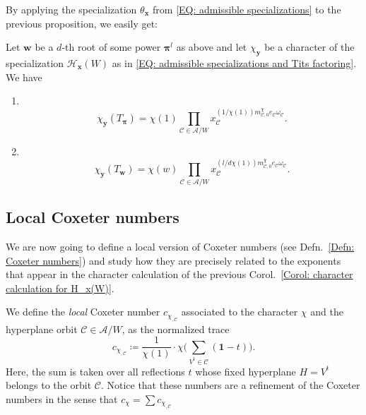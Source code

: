 By applying the specialization $\theta_{\bm x}$ from \eqref{EQ: admissible specializations} to the previous proposition, we easily get: 

\begin{coro}\label{Corol: character calculation for H_x(W)}
Let $\bm w$ be a $d$-th root of some power $\bm \pi^l$ as above and let $\chi_{\bm y}$ be a character of the specialization $\mathcal{H}_{\bm x}(W)$ as in \eqref{EQ: admissible specializations and Tits factoring}. We have \begin{enumerate}
\item\ \vspace{-0.35cm} $$\chi_{\bm y}(T_{\bm \pi})=\chi(1)\prod_{\mathcal{C}\in\mathcal{A}/W}x_{\mathcal{C}}^{(1/\chi(1))m^{\chi}_{\mathcal{C},0}e_{\mathcal{C}}\omega_{\mathcal{C}}}.$$
\item\ \vspace{-0.35cm} $$\chi_{\bm y}(T_{\bm w})=\chi(w)\prod_{\mathcal{C}\in\mathcal{A}/W}x_{\mathcal{C}}^{(l/d\chi(1))m^{\chi}_{\mathcal{C},0}e_{\mathcal{C}}\omega_{\mathcal{C}}}.$$
\end{enumerate}
\end{coro}


\subsection{Local Coxeter numbers}

We are now going to define a local version of Coxeter numbers (see Defn.~\ref{Defn: Coxeter numbers}) and study how they are precisely related to the exponents that appear in the character calculation of the previous Corol.~\ref{Corol: character calculation for H_x(W)}.


\begin{defi}\label{Defn: Local Coxeter numbers} 
We define the \emph{local} Coxeter number $c_{\chi_{,\mathcal{C}}}$ associated to the character $\chi$ and the hyperplane orbit $\mathcal{C}\in\mathcal{A}/W$, as the normalized trace $$c_{\chi_{,\mathcal{C}}}\coloneqq \dfrac{1}{\chi(1)}\cdot\chi\Big( \sum_{V^{t}\in\mathcal{C}}(\bm 1-t)\Big).$$ Here, the sum is taken over all reflections $t$ whose fixed hyperplane $H=V^{t}$ belongs to the orbit $\mathcal{C}$. Notice that these numbers are a refinement of the Coxeter numbers in the sense that $c_{\chi}=\sum c_{\chi_{,\mathcal{C}}}$
\end{defi}

